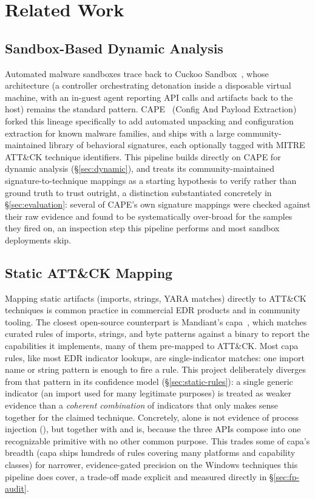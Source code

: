 \section{Related Work}
\label{sec:related-work}

\subsection{Sandbox-Based Dynamic Analysis}

Automated malware sandboxes trace back to Cuckoo Sandbox~\cite{cuckoo},
whose architecture (a controller orchestrating detonation inside a
disposable virtual machine, with an in-guest agent reporting API calls
and artifacts back to the host) remains the standard pattern.
CAPE~\cite{cape} (Config And Payload Extraction) forked this lineage
specifically to add automated unpacking and configuration extraction
for known malware families, and ships with a large community-maintained
library of behavioral signatures, each optionally tagged with MITRE
ATT\&CK technique identifiers. This pipeline builds directly on CAPE
for dynamic analysis (\S\ref{sec:dynamic}), and treats its
community-maintained signature-to-technique mappings as a starting
hypothesis to verify rather than ground truth to trust outright, a
distinction substantiated concretely in \S\ref{sec:evaluation}: several
of CAPE's own signature mappings were checked against their raw
evidence and found to be systematically over-broad for the samples
they fired on, an inspection step this pipeline performs and most
sandbox deployments skip.

\subsection{Static ATT\&CK Mapping}

Mapping static artifacts (imports, strings, YARA matches) directly to
ATT\&CK techniques is common practice in commercial EDR products and in
community tooling. The closest open-source counterpart is
Mandiant's capa~\cite{capa}, which matches curated rules of imports,
strings, and byte patterns against a binary to report the capabilities
it implements, many of them pre-mapped to ATT\&CK. Most capa rules,
like most EDR indicator lookups, are single-indicator matches: one
import name or string pattern is enough to fire a rule. This project
deliberately diverges from that pattern in its confidence model
(\S\ref{sec:static-rules}): a single generic indicator (an import used
for many legitimate purposes) is treated as weaker evidence than a
\emph{coherent combination} of indicators that only makes sense
together for the claimed technique. Concretely, 
alone is not evidence of process injection (), but
 together with  and
 is, because the three APIs compose into
one recognizable primitive with no other common purpose. This trades
some of capa's breadth (capa ships hundreds of rules covering many
platforms and capability classes) for narrower, evidence-gated
precision on the Windows techniques this pipeline does cover, a
trade-off made explicit and measured directly in
\S\ref{sec:fp-audit}.

